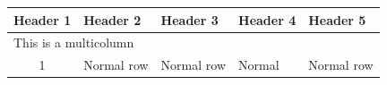 \documentclass{article}
\begin{document}
\begin{longtable}{|c|p{4cm}|p{4cm}|p{2cm}|p{6cm}|}
\hline
Header 1 & Header 2 & Header 3 & Header 4 & Header 5 \\
\hline
\multicolumn{5}{|l|}{This is a multicolumn} \\
\hline
1 & Normal row & Normal row & Normal & Normal row \\
\hline
\end{longtable}
\end{document}
